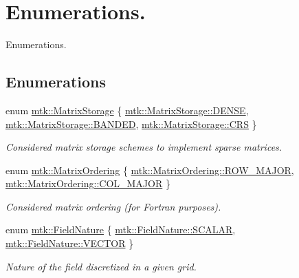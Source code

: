 \hypertarget{group__c02-enums}{\section{Enumerations.}
\label{group__c02-enums}
}


Enumerations.  


\subsection*{Enumerations}
\begin{DoxyCompactItemize}
\item 
enum \hyperlink{group__c02-enums_ga25b67ec6a2afeee69f9bb196a9c66619}{mtk\+::\+Matrix\+Storage} \{ \hyperlink{group__c02-enums_ga25b67ec6a2afeee69f9bb196a9c66619a0706fbbd929bd8abc4de386c53d439ff}{mtk\+::\+Matrix\+Storage\+::\+D\+E\+N\+S\+E}, 
\hyperlink{group__c02-enums_ga25b67ec6a2afeee69f9bb196a9c66619a710800eb2f07821684373493be7fee14}{mtk\+::\+Matrix\+Storage\+::\+B\+A\+N\+D\+E\+D}, 
\hyperlink{group__c02-enums_ga25b67ec6a2afeee69f9bb196a9c66619a22d51ee0c812123c541f2a1bdf794fd1}{mtk\+::\+Matrix\+Storage\+::\+C\+R\+S}
 \}
\begin{DoxyCompactList}\small\item\em Considered matrix storage schemes to implement sparse matrices. \end{DoxyCompactList}\item 
enum \hyperlink{group__c02-enums_ga622801bd9f912d0f976c3e383f5f581c}{mtk\+::\+Matrix\+Ordering} \{ \hyperlink{group__c02-enums_ga622801bd9f912d0f976c3e383f5f581ca21541962976d7709c26e9cd8385bd648}{mtk\+::\+Matrix\+Ordering\+::\+R\+O\+W\+\_\+\+M\+A\+J\+O\+R}, 
\hyperlink{group__c02-enums_ga622801bd9f912d0f976c3e383f5f581ca34d2765ffc490951febdcca04bc4f7cd}{mtk\+::\+Matrix\+Ordering\+::\+C\+O\+L\+\_\+\+M\+A\+J\+O\+R}
 \}
\begin{DoxyCompactList}\small\item\em Considered matrix ordering (for Fortran purposes). \end{DoxyCompactList}\item 
enum \hyperlink{group__c02-enums_ga4c54f2a329cfb4e56213b02a259d19e2}{mtk\+::\+Field\+Nature} \{ \hyperlink{group__c02-enums_ga4c54f2a329cfb4e56213b02a259d19e2a8f3d9a4b6a7b7f2c7afa61ca113d0db9}{mtk\+::\+Field\+Nature\+::\+S\+C\+A\+L\+A\+R}, 
\hyperlink{group__c02-enums_ga4c54f2a329cfb4e56213b02a259d19e2a87752381b583740610f1dfeb07fdad7e}{mtk\+::\+Field\+Nature\+::\+V\+E\+C\+T\+O\+R}
 \}
\begin{DoxyCompactList}\small\item\em Nature of the field discretized in a given grid. \end{DoxyCompactList}\item 

\end{DoxyCompactItemize}
